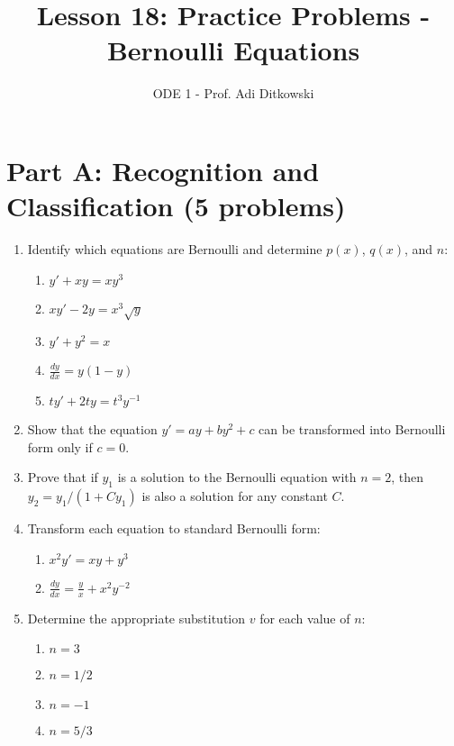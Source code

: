 \documentclass[12pt]{article}
\title{Lesson 18: Practice Problems - Bernoulli Equations}
\author{ODE 1 - Prof. Adi Ditkowski}
\date{}
\begin{document}
\maketitle

\section*{Part A: Recognition and Classification (5 problems)}

\begin{enumerate}
    \item Identify which equations are Bernoulli and determine $p(x)$, $q(x)$, and $n$:
    \begin{enumerate}
        \item $y' + xy = xy^3$
        \item $xy' - 2y = x^3\sqrt{y}$
        \item $y' + y^2 = x$
        \item $\frac{dy}{dx} = y(1 - y)$
        \item $ty' + 2ty = t^3y^{-1}$
    \end{enumerate}

    \item Show that the equation $y' = ay + by^2 + c$ can be transformed into Bernoulli form only if $c = 0$.

    \item Prove that if $y_1$ is a solution to the Bernoulli equation with $n = 2$, then $y_2 = y_1/(1 + Cy_1)$ is also a solution for any constant $C$.

    \item Transform each equation to standard Bernoulli form:
    \begin{enumerate}
        \item $x^2y' = xy + y^3$
        \item $\frac{dy}{dx} = \frac{y}{x} + x^2y^{-2}$
    \end{enumerate}

    \item Determine the appropriate substitution $v$ for each value of $n$:
    \begin{enumerate}
        \item $n = 3$
        \item $n = 1/2$
        \item $n = -1$
        \item $n = 5/3$
    \end{enumerate}
\end{enumerate}
\end{document}
